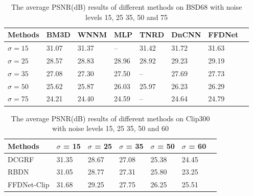 \documentclass[journal]{IEEEtran}
\begin{document}
\begin{table}[!bp]\footnotesize{}
\caption{The average PSNR(dB) results of different methods on BSD68 with noise levels 15, 25 35, 50 and 75}
\center
\begin{tabular}{|p{1.2cm}<{\centering}|p{.75cm}<{\centering}|p{.75cm}<{\centering}|p{.75cm}<{\centering}|p{.75cm}<{\centering}|p{.75cm}<{\centering}|p{.75cm}<{\centering}|p{.75cm}<{\centering}|}
  \hline\rowcolor[gray]{.9}
  Methods &  BM3D&  WNNM& MLP & TNRD   &  DnCNN &   FFDNet \\ \hline
  $\sigma = 15$ & 31.07 &  31.37& -- &31.42  &  31.72 & 31.63  \\\hline
  $\sigma = 25$ & 28.57 &  28.83  & 28.96&28.92 & 29.23   & 29.19\\\hline
  $\sigma = 35$ & 27.08 &  27.30  & 27.50 &-- & 27.69   & 27.73\\\hline
  $\sigma = 50$ & 25.62 &  25.87  & 26.03 &25.97 &  26.23 & 26.29 \\\hline
  $\sigma = 75$ & 24.21 &  24.40  & 24.59 &-- & 24.64   & 24.79\\
  \hline
\end{tabular}%
\label{table_bsd68}
\end{table}

\begin{table}[!bp]\footnotesize{}
\caption{The average PSNR(dB) results of different methods on Clip300 with noise levels 15, 25 35, 50 and 60}
\center
\begin{tabular}{|p{1.75cm}<{\centering}|p{.82cm}<{\centering}|p{.82cm}<{\centering}|p{.82cm}<{\centering}|p{.82cm}<{\centering}|p{.82cm}<{\centering}|p{.82cm}<{\centering}|}
  \hline\rowcolor[gray]{.9}
  Methods    & $\sigma$ = 15    & $\sigma$ = 25   & $\sigma$ = 35      & $\sigma$ = 50     & $\sigma$ = 60    \\ \hline
  DCGRF      & 31.35 &  28.67   & 27.08  & 25.38  &  24.45  \\\hline
  RBDN     & 31.05  &  28.77  & 27.31  & 25.80  & 23.25   \\\hline
  FFDNet-Clip& 31.68   &  29.25 & 27.75  &26.25 & 25.51   \\
  \hline
\end{tabular}
\label{table_set300}
\end{table}
\end{document}
